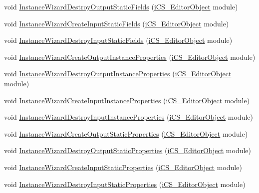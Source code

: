 \begin{DoxyCompactItemize}
\item 
void \hyperlink{classi_c_s___i_storage_af38a1d18f4ae4d759c02b27448f6e23f}{Instance\+Wizard\+Destroy\+Output\+Static\+Fields} (\hyperlink{classi_c_s___editor_object}{i\+C\+S\+\_\+\+Editor\+Object} module)
\item 
void \hyperlink{classi_c_s___i_storage_ac97030c9a3a7d09855eb03078aa3d60f}{Instance\+Wizard\+Create\+Input\+Static\+Fields} (\hyperlink{classi_c_s___editor_object}{i\+C\+S\+\_\+\+Editor\+Object} module)
\item 
void \hyperlink{classi_c_s___i_storage_ac959da6d61fee4b93325b485c24f5afc}{Instance\+Wizard\+Destroy\+Input\+Static\+Fields} (\hyperlink{classi_c_s___editor_object}{i\+C\+S\+\_\+\+Editor\+Object} module)
\item 
void \hyperlink{classi_c_s___i_storage_ada25a61b66ca68dcf10e1e5902ca3f7a}{Instance\+Wizard\+Create\+Output\+Instance\+Properties} (\hyperlink{classi_c_s___editor_object}{i\+C\+S\+\_\+\+Editor\+Object} module)
\item 
void \hyperlink{classi_c_s___i_storage_a5e58a4cc79f4f21f145285ff365f6cb3}{Instance\+Wizard\+Destroy\+Output\+Instance\+Properties} (\hyperlink{classi_c_s___editor_object}{i\+C\+S\+\_\+\+Editor\+Object} module)
\item 
void \hyperlink{classi_c_s___i_storage_ac6e4a94ebf6c4238ff24c4e70200a142}{Instance\+Wizard\+Create\+Input\+Instance\+Properties} (\hyperlink{classi_c_s___editor_object}{i\+C\+S\+\_\+\+Editor\+Object} module)
\item 
void \hyperlink{classi_c_s___i_storage_a227d9b1044133ccda4fd89c68ee3a509}{Instance\+Wizard\+Destroy\+Input\+Instance\+Properties} (\hyperlink{classi_c_s___editor_object}{i\+C\+S\+\_\+\+Editor\+Object} module)
\item 
void \hyperlink{classi_c_s___i_storage_a8c578184b9e71bb222b57ec2b3884ae0}{Instance\+Wizard\+Create\+Output\+Static\+Properties} (\hyperlink{classi_c_s___editor_object}{i\+C\+S\+\_\+\+Editor\+Object} module)
\item 
void \hyperlink{classi_c_s___i_storage_ae7c4422f06856f745a640adeeb83a998}{Instance\+Wizard\+Destroy\+Output\+Static\+Properties} (\hyperlink{classi_c_s___editor_object}{i\+C\+S\+\_\+\+Editor\+Object} module)
\item 
void \hyperlink{classi_c_s___i_storage_add1de201adeadf37d699dbf7d972635f}{Instance\+Wizard\+Create\+Input\+Static\+Properties} (\hyperlink{classi_c_s___editor_object}{i\+C\+S\+\_\+\+Editor\+Object} module)
\item 
void \hyperlink{classi_c_s___i_storage_a2187e5acf06ed79540f6063aa7fc174c}{Instance\+Wizard\+Destroy\+Input\+Static\+Properties} (\hyperlink{classi_c_s___editor_object}{i\+C\+S\+\_\+\+Editor\+Object} module)

\end{DoxyCompactItemize}
